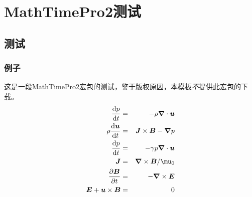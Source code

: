 
\chapter{MathTimePro2测试}
\section{测试}       %

\subsection{例子}    %
这是一段MathTimePro2宏包的测试，鉴于版权原因，本模板\emph{不}提供此宏包的下载。
\begin{eqnarray}
\frac{\dif p}{\dif t} & = & -\rho\nbl\cdot \bm{u} \\
\rho\frac{\dif\bm{u}}{\dif t} & = & \bm{J}\times\bm{B}-\nbl p\\
\frac{\dif p}{\dif t} & = & -\gamma p\nbl\cdot\bm{u}\\
\bm{J} & = & {\nbl\times\bm{B}}/{\mu_0}\\
\frac{\partial \bm{B}}{\partial t} & = & -\nbl\times\bm{E}\\
\bm{E}+\bm{u}\times\bm{B} & = & 0
\end{eqnarray}
